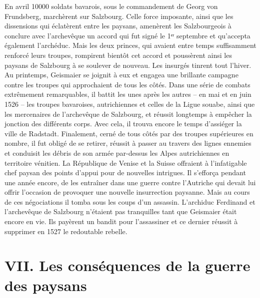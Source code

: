 \documentclass[french,twoside]{book} %
\newcommand\chapteropen{} %
\newcommand\chapterclose{} %
\begin{document}
En avril 10000 soldats bavarois, sous le commandement de Georg von Frundsberg, marchèrent sur Salzbourg. Celle force imposante, ainsi que les dissensions qui éclatèrent entre les paysans, amenèrent les Salzbourgeois à conclure avec l’archevêque un accord qui fut signé le 1ᵉʳ septembre et qu’accepta également l’archéduc. Mais les deux princes, qui avaient entre temps suffisamment renforcé leurs troupes, rompirent bientôt cet accord et poussèrent ainsi les paysans de Salzbourg à se soulever de nouveau. Les insurgés tinrent tout l’hiver. Au printemps, Geismaier se joignit à eux et engagea une brillante campagne contre les troupes qui approchaient de tous les côtés. Dans une série de combats extrêmement remarquables, il battit les unes après les autres – en mai et en juin 1526 – les troupes bavaroises, autrichiennes et celles de la Ligue souabe, ainsi que les mercenaires de l’archevêque de Salzbourg, et réussit longtemps à empêcher la jonction des différents corps. Avec cela, il trouva encore le temps d’assiéger la ville de Radstadt. Finalement, cerné de tous côtés par des troupes supérieures en nombre, il fut obligé de se retirer, réussit à passer au travers des lignes ennemies et conduisit les débris de son armée par-dessus les Alpes autrichiennes en territoire vénitien. La République de Venise et la Suisse offraient à l’infatigable chef paysan des points d’appui pour de nouvelles intrigues. Il s’efforça pendant une année encore, de les entraîner dans une guerre contre l’Autriche qui devait lui offrir l’occasion de provoquer une nouvelle insurrection paysanne. Mais au cours de ces négociations il tomba sous les coups d’un assassin. L’archiduc Ferdinand et l’archevêque de Salzbourg n’étaient pas tranquilles tant que Geismaier était encore en vie. Ils payèrent un bandit pour l’assassiner et ce dernier réussit à supprimer en 1527 le redoutable rebelle.
\chapterclose


\chapteropen
\renewcommand{\leftmark}{VII. Les conséquences de la guerre des paysans}
\chapter[VII. Les conséquences de la guerre des paysans]{VII. Les conséquences de la guerre des paysans}
\end{document}

